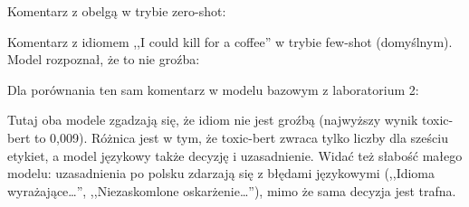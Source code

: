 Komentarz z obelgą w trybie zero-shot:


Komentarz z idiomem ,,I could kill for a coffee'' w trybie few-shot (domyślnym). Model rozpoznał, że to nie groźba:


Dla porównania ten sam komentarz w modelu bazowym  z laboratorium 2:


Tutaj oba modele zgadzają się, że idiom nie jest groźbą (najwyższy wynik toxic-bert to 0,009). Różnica jest
w tym, że toxic-bert zwraca tylko liczby dla sześciu etykiet, a model językowy także decyzję i uzasadnienie. Widać też
słabość małego modelu: uzasadnienia po polsku zdarzają się z błędami językowymi (,,Idioma wyrażające\ldots'',
,,Niezaskomlone oskarżenie\ldots''), mimo że sama decyzja jest trafna.
